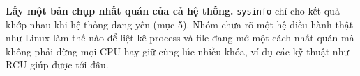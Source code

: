 \item \textbf{Lấy một bản chụp nhất quán của cả hệ thống.} \texttt{sysinfo} chỉ cho kết quả khớp nhau khi hệ thống đang yên (mục 5). Nhóm chưa rõ một hệ điều hành thật như Linux làm thế nào để liệt kê process và file đang mở một cách nhất quán mà không phải dừng mọi CPU hay giữ cùng lúc nhiều khóa, ví dụ các kỹ thuật như RCU giúp được tới đâu.
